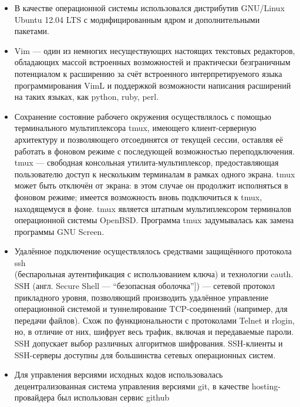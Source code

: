 \begin{itemize}

\item В качестве операционной системы использовался дистрибутив GNU/Linux
  Ubuntu 12.04 LTS с модифицированным ядром и дополнительными пакетами.

\item Vim --- один из немногих несуществующих настоящих текстовых редакторов,
  обладающих массой встроенных возможностей и практически безграничным
  потенциалом к расширению за счёт встроенного интерпретируемого языка
  программирования VimL и поддержкой возможности написания расширений на
  таких языках, как python, ruby, perl.

\item Сохранение состояние рабочего окружения осуществлялось с помощью терминального
мультиплексора tmux, имеющего клиент-серверную архитектуру и
позволяющего отсоединятся от текущей сессии, оставляя её работать в фоновом
режиме с последующей возможностью переподключения.
tmux — свободная консольная утилита-мультиплексор,
предоставляющая пользователю доступ к нескольким терминалам в рамках
одного экрана. tmux может быть отключён от экрана: в этом случае он
продолжит исполняться в фоновом режиме; имеется возможность вновь
подключиться к tmux, находящемуся в фоне. tmux является штатным
мультиплексором терминалов операционной системы OpenBSD.
Программа tmux задумывалась как замена программы GNU Screen.

\item Удалённое подключение осуществлялось средствами защищённого протокола
ssh\\
(беспарольная аутентификация с использованием ключа) и технологии cauth.
SSH (англ. Secure Shell — ``безопасная оболочка'']) — сетевой протокол
прикладного уровня, позволяющий производить удалённое управление операционной
системой и туннелирование TCP-соединений (например, для передачи файлов).
Схож по функциональности с протоколами Telnet и rlogin, но, в отличие от них,
шифрует весь трафик, включая и передаваемые пароли. SSH допускает выбор
различных алгоритмов шифрования. SSH-клиенты и SSH-серверы доступны для
большинства сетевых операционных систем.

\item Для управления версиями исходных кодов использовалась децентрализованная
  система управления версиями git, в качестве hosting-провайдера был
  использован сервис github

\end{itemize}


